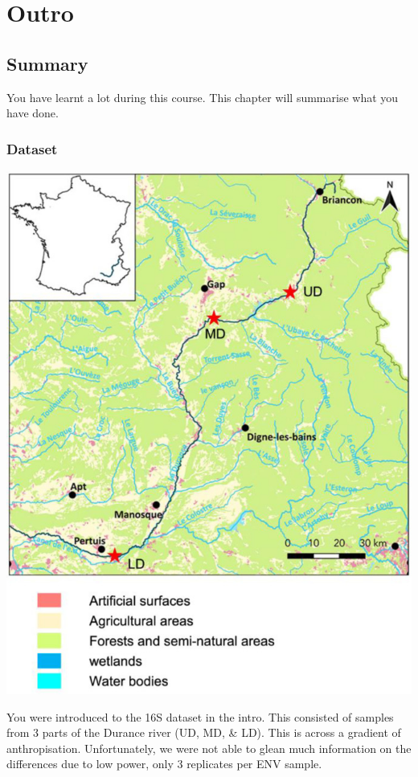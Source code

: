 \documentclass[
]{book}
\begin{document}
\hypertarget{part-outro}{%
\part*{Outro}\label{part-outro}}

\hypertarget{sumchap}{%
\chapter{Summary}\label{sumchap}}

You have learnt a lot during this course. This chapter will summarise what you have done.

\hypertarget{dataset-1}{%
\section{Dataset}\label{dataset-1}}

\includegraphics{figures/freshwater_france.png}

You were introduced to the 16S dataset in the intro.
This consisted of samples from 3 parts of the Durance river (UD, MD, \& LD).
This is across a gradient of anthropisation.
Unfortunately, we were not able to glean much information on the differences due to low power, only 3 replicates per ENV sample.
\end{document}
